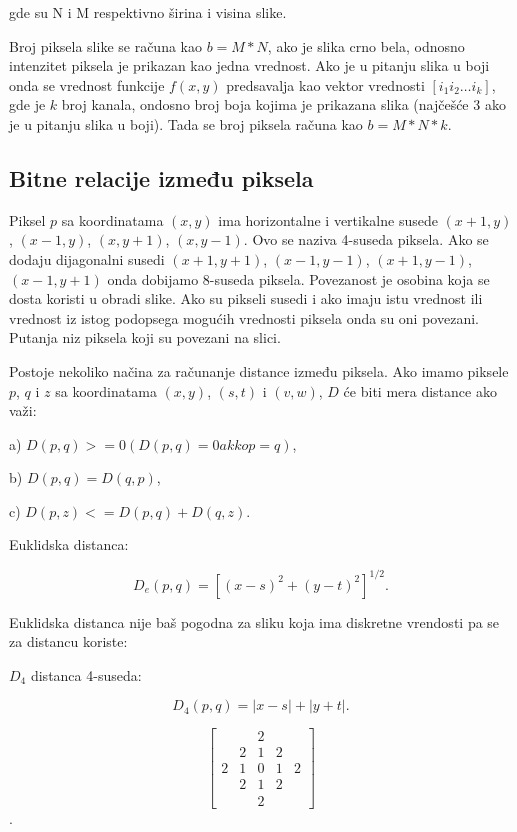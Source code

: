 \documentclass[a4paper,12pt,titlepage]{article}
\begin{document}
gde su N i M respektivno širina i visina slike.

Broj piksela slike se računa kao $b = M * N$, ako je slika crno bela, odnosno intenzitet piksela je prikazan kao jedna vrednost. Ako je u pitanju slika u boji onda se vrednost funkcije $f(x, y)$ predsavalja kao vektor vrednosti $[i_{1} i_{2} \dots i_{k}]$, gde je $k$ broj kanala, ondosno broj boja kojima je prikazana slika (najčešće 3 ako je u pitanju slika u boji). Tada se broj piksela računa kao $b = M * N * k$.

\subsection{Bitne relacije između piksela}%

Piksel $p$ sa koordinatama $(x, y)$ ima horizontalne i vertikalne susede $(x + 1, y)$, $(x - 1, y)$, $(x, y + 1)$, $(x, y - 1)$. Ovo se naziva 4-suseda piksela. Ako se dodaju dijagonalni susedi $(x + 1, y + 1)$, $(x - 1, y - 1)$, $(x + 1, y - 1)$, $(x - 1, y + 1)$ onda dobijamo 8-suseda piksela. Povezanost je osobina koja se dosta koristi u obradi slike. Ako su pikseli susedi i ako imaju istu vrednost ili vrednost iz istog podopsega mogućih vrednosti piksela onda su oni povezani. Putanja niz piksela koji su povezani na slici.

Postoje nekoliko načina za računanje distance između piksela. Ako imamo piksele $p$, $q$ i $z$ sa koordinatama $(x, y)$, $(s, t)$ i $(v, w)$, $D$ će biti mera distance ako važi: 

a) $D(p, q) >= 0 (D(p, q) = 0 akko p = q)$,

b) $D(p, q) = D(q, p)$,

c) $D(p, z) <= D(p, q) + D(q, z)$.

Euklidska distanca: 

\begin{equation}\label{eq:euclid}
D_{e}(p, q) = [ (x  - s)^{2} + (y - t)^{2} ]^{1/2}.
\end{equation} 

Euklidska distanca nije baš pogodna za sliku koja ima diskretne vrendosti pa se za distancu koriste:

$D_{4}$ distanca 4-suseda:

\begin{equation}\label{eq:4ne}
D_{4}(p, q) = |x - s| + |y + t|.
\end{equation} 

\[
\begin{bmatrix}
     &  & 2 &   &  \\
     & 2 & 1 & 2  &  \\
     2 & 1 & 0 & 1 & 2 \\
     & 2 & 1 & 2  &  \\
     &  & 2 &   &  
\end{bmatrix}
\].
\end{document}
